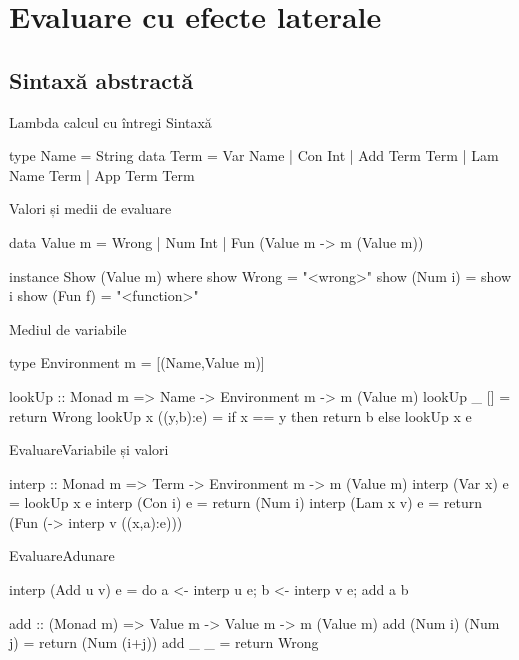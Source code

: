 \documentclass[xcolor=pdftex,romanian,colorlinks]{beamer}
\begin{document}
\section{Evaluare cu efecte laterale}

\subsection{Sintaxă abstractă}

\begin{frame}[fragile]{Lambda calcul cu întregi}
{Sintaxă}
\begin{asciihs}
type Name = String
data Term
  = Var Name
  | Con Int
  | Add Term Term
  | Lam Name Term
  | App Term Term
\end{asciihs}
\end{frame}


\begin{frame}[fragile]
{Valori și medii de evaluare}
\begin{asciihs}
data Value m
  = Wrong
  | Num Int
  | Fun (Value m -> m (Value m))
  
instance Show (Value m) where
  show Wrong = "<wrong>"
  show (Num i) = show i
  show (Fun f) = "<function>"
\end{asciihs}
\end{frame}

\begin{frame}[fragile]
{Mediul de variabile}
\begin{asciihs}
type Environment m = [(Name,Value m)]

lookUp :: Monad m => Name -> Environment m -> m (Value m)
lookUp _ [] 
  = return Wrong
lookUp x ((y,b):e)
  = if x == y then return b else lookUp x e
\end{asciihs}
\end{frame}

\begin{frame}[fragile]
{Evaluare}{Variabile și valori}
\begin{asciihs}
interp :: Monad m => Term -> Environment m -> m (Value m)
interp (Var x) e   = lookUp x e
interp (Con i) e   = return (Num i)
interp (Lam x v) e = return (Fun (\a -> interp v ((x,a):e)))
\end{asciihs}
\end{frame}



\begin{frame}[fragile]
{Evaluare}{Adunare}
\begin{asciihs}
interp (Add u v) e = 
  do {
    a <- interp u e;
    b <- interp v e;
    add a b
  }

add :: (Monad m) => Value m -> Value m -> m (Value m)
add (Num i) (Num j) = return (Num (i+j))
add _       _       = return Wrong
\end{asciihs}
\end{frame}
\end{document}
